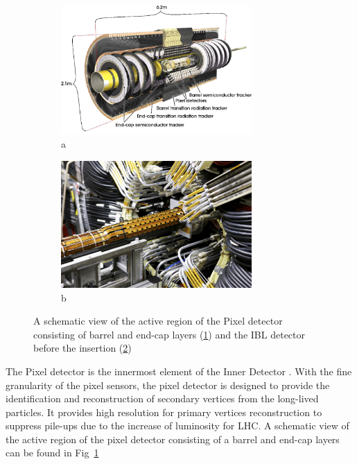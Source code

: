 \begin{figure}[htbp!]
\begin{subfigure}{.5\textwidth}
 \centering
 \includegraphics[width=0.8\textwidth]{chapters/c4/figures/pixel}
 \caption{a}
 \label{fig:pixel1}
\end{subfigure}%
\begin{subfigure}{.5\textwidth}
 \centering
 \includegraphics[width=0.8\textwidth]{chapters/c4/figures/IBL}
 \caption{b}
 \label{fig:pixel2}
\end{subfigure}
 \caption{A schematic view of the active region of the Pixel detector consisting of barrel and end-cap layers (\ref{fig:pixel1}) and the IBL detector before the insertion (\ref{fig:pixel2})}
\label{fig:pixel}
\end{figure}
\par The Pixel detector is the innermost element of the Inner Detector \cite{Hirono:2641635}. With the fine granularity of the pixel sensors, 
the pixel detector is designed to provide the identification and reconstruction of secondary vertices from the long-lived particles. It provides high resolution for primary vertices reconstruction to suppress pile-ups due to the increase of luminosity for LHC. A schematic view of the active region of the pixel detector consisting of a barrel and end-cap layers can be found in Fig~\ref{fig:pixel1}
